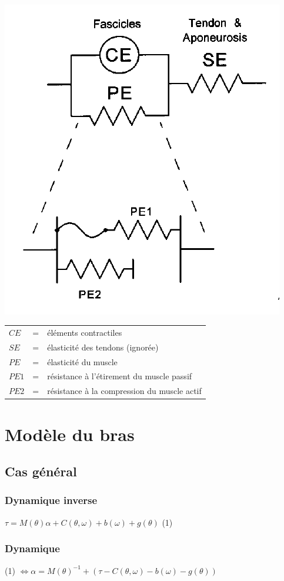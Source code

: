 \documentclass[pdftex,a4paper,11pt]{article}
\begin{document}
\paragraph{}
\begin{center}
        \includegraphics[width=.40\linewidth]{fig/brown}
\end{center}

\begin{tabular}{lcl}
    $CE$  & = & éléments contractiles \\
    $SE$  & = & élasticité des tendons (ignorée) \\
    $PE$  & = & élasticité du muscle \\
    $PE1$ & = & résistance à l'étirement du muscle passif \\
    $PE2$ & = & résistance à la compression du muscle actif \\
\end{tabular}



\section{Modèle du bras}


\subsection{Cas général}

\subsubsection{Dynamique inverse}
$\tau = M(\theta)\alpha + C(\theta, \omega) + b(\omega) + g(\theta) $ (1)

\subsubsection{Dynamique}
(1) $\Leftrightarrow \alpha = M(\theta)^{-1} + (\tau - C(\theta, \omega) - b(\omega) - g(\theta)) $
\end{document}
